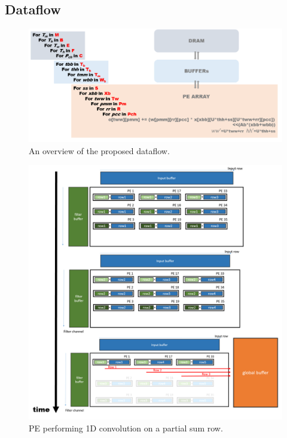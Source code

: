 \subsection{Dataflow}
\begin{figure}[h]
    \centering
    \includegraphics[width=0.9\linewidth]{inc/4_proposed_architecture/figure/dataflow.png}
    \caption{An overview of the proposed dataflow.}
    \label{fig:dataflow}
\end{figure}
\begin{figure}[h]
    \centering
    \includegraphics[width=1\linewidth]{inc/4_proposed_architecture/figure/pe_dataflow.png}
    \caption{PE performing 1D convolution on a partial sum row.}
    \label{fig:pe_dataflow}
\end{figure}
